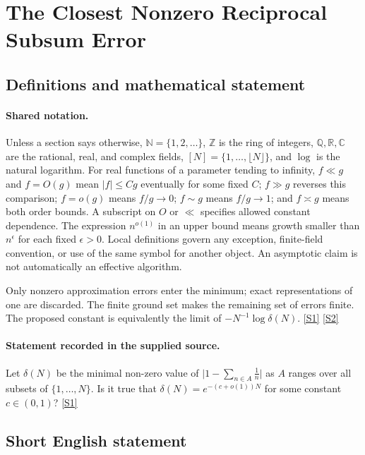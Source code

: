 \documentclass[11pt,a4paper]{article}
\newcommand{\N}{\mathbb{N}}
\newcommand{\Z}{\mathbb{Z}}
\newcommand{\Q}{\mathbb{Q}}
\newcommand{\R}{\mathbb{R}}
\newcommand{\C}{\mathbb{C}}
\newcommand{\sref}[2]{\hyperlink{source:#1:#2}{[S#2]}}
\begin{document}
\section{The Closest Nonzero Reciprocal Subsum Error}\label{statement}


\subsection{Definitions and mathematical statement}

\paragraph{Shared notation.}Unless a section says otherwise, $\N=\{1,2,\ldots\}$,
$\Z$ is the ring of integers, $\Q,\R,\C$ are the rational, real, and complex
fields, $[N]=\{1,\ldots,\lfloor N\rfloor\}$, and $\log$ is the natural
logarithm. For real functions of a parameter tending to infinity,
$f\ll g$ and $f=O(g)$ mean $|f|\leq Cg$ eventually for some fixed $C$;
$f\gg g$ reverses this comparison; $f=o(g)$ means $f/g\to0$;
$f\sim g$ means $f/g\to1$; and $f\asymp g$ means both order bounds.
A subscript on $O$ or $\ll$ specifies allowed constant dependence.
The expression $n^{o(1)}$ in an upper bound means growth smaller than
$n^\epsilon$ for each fixed $\epsilon>0$. Local definitions govern any
exception, finite-field convention, or use of the same symbol for another
object. An asymptotic claim is not automatically an effective algorithm.



Only nonzero approximation errors enter the minimum; exact representations of one are discarded. The finite ground set makes the remaining set of errors finite. The proposed constant is equivalently the limit of $-N^{-1}\log\delta(N)$. \sref{statement}{1} \sref{statement}{2}

\paragraph{Statement recorded in the supplied source.}
Let $\delta(N)$ be the minimal non-zero value of $\lvert 1-\sum_{n\in A}\frac{1}{n}\rvert$ as $A$ ranges over all subsets of $\{1,\ldots,N\}$. Is it true that $ \delta(N)=e^{-(c+o(1))N} $ for some constant $c\in (0,1)$? \sref{statement}{1}

\subsection{Short English statement}
\end{document}
